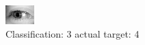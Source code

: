 \begin{figure}[h!]
\begin{center}
\includegraphics[width=0.60\columnwidth]{figures/ID3260_class_3_target_4.png}
\end{center}
\caption{ Classification: 3 actual target: 4}
\label{fig:ID3260_class_3_target_4}
\end{figure}
